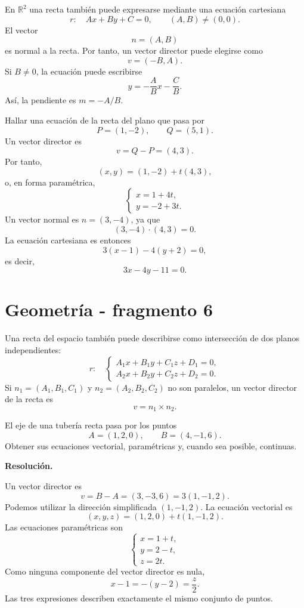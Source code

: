 En $\mathbb{R}^2$ una recta también puede expresarse mediante una ecuación cartesiana
\[
r:\quad Ax+By+C=0,
\qquad (A,B)\neq(0,0).
\]
El vector
\[
n=(A,B)
\]
es normal a la recta. Por tanto, un vector director puede elegirse como
\[
v=(-B,A).
\]
Si $B\neq0$, la ecuación puede escribirse
\[
y=-\frac ABx-\frac CB.
\]
Así, la pendiente es $m=-A/B$.

\begin{example}
Hallar una ecuación de la recta del plano que pasa por
\[
P=(1,-2),\qquad Q=(5,1).
\]
Un vector director es
\[
v=Q-P=(4,3).
\]
Por tanto,
\[
(x,y)=(1,-2)+t(4,3),
\]
o, en forma paramétrica,
\[
\begin{cases}
x=1+4t,\\
y=-2+3t.
\end{cases}
\]
Un vector normal es $n=(3,-4)$, ya que
\[
(3,-4)\cdot(4,3)=0.
\]
La ecuación cartesiana es entonces
\[
3(x-1)-4(y+2)=0,
\]
es decir,
\[
\boxed{3x-4y-11=0.}
\]
\end{example}


\section{Geometría - fragmento 6}
Una recta del espacio también puede describirse como intersección de dos planos independientes:
\[
r:\quad
\begin{cases}
A_1x+B_1y+C_1z+D_1=0,\\
A_2x+B_2y+C_2z+D_2=0.
\end{cases}
\]
Si $n_1=(A_1,B_1,C_1)$ y $n_2=(A_2,B_2,C_2)$ no son paralelos, un vector director de la recta es
\[
v=n_1\times n_2.
\]

\begin{solvedexercise}
El eje de una tubería recta pasa por los puntos
\[
A=(1,2,0),\qquad B=(4,-1,6).
\]
Obtener sus ecuaciones vectorial, paramétricas y, cuando sea posible, continuas.

\textbf{Resolución.}\par\smallskip
Un vector director es
\[
v=B-A=(3,-3,6)=3(1,-1,2).
\]
Podemos utilizar la dirección simplificada $(1,-1,2)$. La ecuación vectorial es
\[
\boxed{(x,y,z)=(1,2,0)+t(1,-1,2).}
\]
Las ecuaciones paramétricas son
\[
\boxed{
\begin{cases}
x=1+t,\\
y=2-t,\\
z=2t.
\end{cases}}
\]
Como ninguna componente del vector director es nula,
\[
\boxed{x-1=-(y-2)=\frac z2.}
\]
Las tres expresiones describen exactamente el mismo conjunto de puntos.
\end{solvedexercise}

